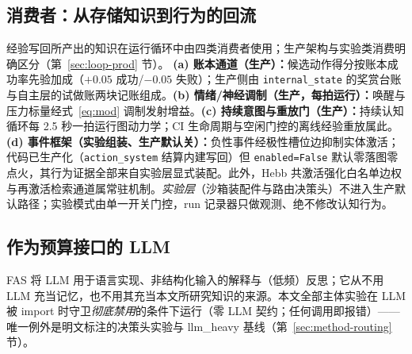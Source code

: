 \documentclass[10pt,a4paper]{ctexart}
\begin{document}
\subsection{消费者：从存储知识到行为的回流}
\label{sec:arch-consumers}
经验写回所产出的知识在运行循环中由四类消费者使用；生产架构与实验类消费明确区分（第~\ref{sec:loop-prod} 节）。
\textbf{(a) 账本通道（生产）：}候选动作得分按账本成功率先验加成（$+0.05$ 成功/$-0.05$ 失败）；生产侧由 \texttt{internal\_state} 的奖赏台账与自主层的试做账两块记账组成。\textbf{(b) 情绪/神经调制（生产，每拍运行）：}唤醒与压力标量经式~\ref{eq:mod} 调制发射增益。\textbf{(c) 持续意图与重放门（生产）：}持续认知循环每 2.5 秒一拍运行图动力学；CI 生命周期与空闲门控的离线经验重放属此。\textbf{(d) 事件框架（实验组装、生产默认关）：}负性事件经极性槽位边抑制实体激活；代码已生产化（\texttt{action\_system} 结算内建写回）但 \texttt{enabled=False} 默认零落图零点火，其行为证据全部来自实验层显式装配。此外，Hebb 共激活强化白名单边权与再激活检索通道属常驻机制。\emph{实验层}（沙箱装配件与路由决策头）不进入生产默认路径；实验模式由单一开关门控，run 记录器只做观测、绝不修改认知行为。

\subsection{作为预算接口的 LLM}
\label{sec:arch-llm}
FAS 将 LLM 用于语言实现、非结构化输入的解释与（低频）反思；它从不用 LLM 充当记忆，也不用其充当本文所研究知识的来源。本文全部主体实验在 LLM 被 import 时守卫\emph{彻底禁用}的条件下运行（零 LLM 契约；任何调用即报错）——唯一例外是明文标注的决策头实验与 llm\_heavy 基线（第~\ref{sec:method-routing} 节）。
\end{document}
